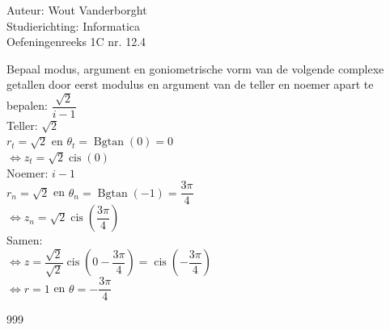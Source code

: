 \documentclass[a4paper]{article}
\newcommand{\Bgtan}{\operatorname{Bgtan}}
\newcommand{\cis}{\operatorname{cis}}
\begin{document}
  
\noindent \large Auteur: Wout Vanderborght\\
\noindent \large Studierichting: Informatica\\
\noindent \large Oefeningenreeks 1C nr. 12.4\\

\medskip

\normalsize

Bepaal modus, argument en goniometrische vorm van de volgende complexe \\

getallen door eerst modulus en argument van de teller en noemer apart te \\

bepalen: $ \dfrac{\sqrt{2}}{i-1} $ \\

Teller: $ \sqrt{2} $ \\

$ r_t = \sqrt{2} $ en $ \theta_t = \Bgtan\left(0\right) = 0 $ \\

$ \Leftrightarrow z_t = \sqrt{2} \cis\left(0\right) $ \\ 

Noemer: $ i-1 $ \\

$ r_n = \sqrt{2} $ en $ \theta_n = \Bgtan\left(-1\right) = \dfrac{3\pi}{4} $ \\

$ \Leftrightarrow z_n = \sqrt{2}\cis\left(\dfrac{3\pi}{4}\right) $ \\

Samen: \\

$ \Leftrightarrow z = \dfrac{\sqrt{2}}{\sqrt{2}}\cis\left(0-\dfrac{3\pi}{4}\right) = \cis\left(-\dfrac{3\pi}{4}\right) $ \\

$ \Leftrightarrow r = 1 $ en $ \theta = -\dfrac{3\pi}{4} $ \\

\begin{thebibliography}{999}
\end{thebibliography}
\end{document}
